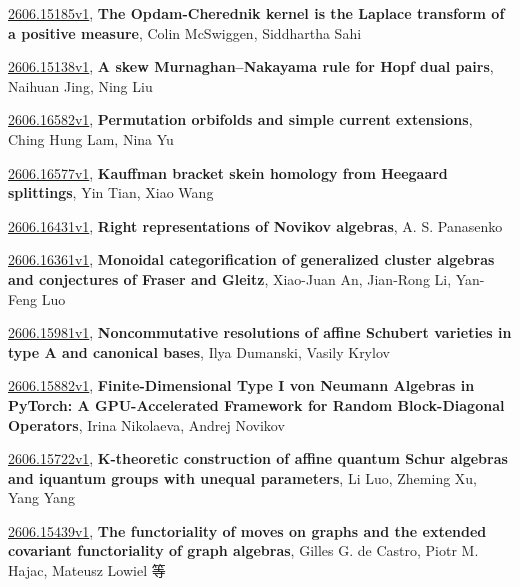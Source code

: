 \documentclass[9pt, a4paper]{article}
\theoremstyle{plain}
\theoremstyle{definition}
\theoremstyle{remark}
\newcommand{\arxiv}[3]{\href{https://arxiv.org/abs/#1}{#1}, \textbf{\textcolor{arxivblue}{#2}}, #3}
\begin{document}
\arxiv{2606.15185v1}{The Opdam-Cherednik kernel is the Laplace transform of a positive measure}{Colin McSwiggen, Siddhartha Sahi}

\arxiv{2606.15138v1}{A skew Murnaghan--Nakayama rule for Hopf dual pairs}{Naihuan Jing, Ning Liu}

\arxiv{2606.16582v1}{Permutation orbifolds and simple current extensions}{Ching Hung Lam, Nina Yu}

\arxiv{2606.16577v1}{Kauffman bracket skein homology from Heegaard splittings}{Yin Tian, Xiao Wang}

\arxiv{2606.16431v1}{Right representations of Novikov algebras}{A. S. Panasenko}

\arxiv{2606.16361v1}{Monoidal categorification of generalized cluster algebras and conjectures of Fraser and Gleitz}{Xiao-Juan An, Jian-Rong Li, Yan-Feng Luo}

\arxiv{2606.15981v1}{Noncommutative resolutions of affine Schubert varieties in type A and canonical bases}{Ilya Dumanski, Vasily Krylov}

\arxiv{2606.15882v1}{Finite-Dimensional Type I von Neumann Algebras in PyTorch: A GPU-Accelerated Framework for Random Block-Diagonal Operators}{Irina Nikolaeva, Andrej Novikov}

\arxiv{2606.15722v1}{K-theoretic construction of affine quantum Schur algebras and iquantum groups with unequal parameters}{Li Luo, Zheming Xu, Yang Yang}

\arxiv{2606.15439v1}{The functoriality of moves on graphs and the extended covariant functoriality of graph algebras}{Gilles G. de Castro, Piotr M. Hajac, Mateusz Lowiel 等}

\end{document}
